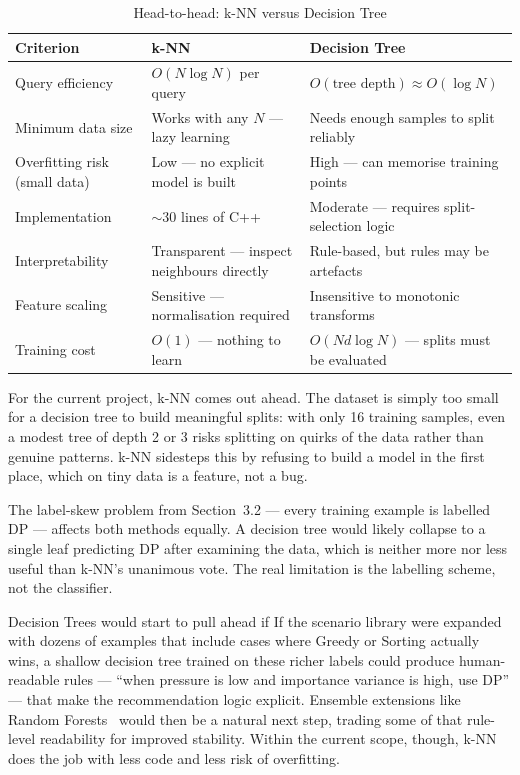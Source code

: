 \documentclass[12pt,a4paper]{article}
\begin{document}
\begin{table}[H]
\centering
\caption{Head-to-head: k-NN versus Decision Tree}
\label{tab:comparison}
\begin{tabular}{@{}p{2.8cm}p{4.2cm}p{4.2cm}@{}}
\toprule
\textbf{Criterion} & \textbf{k-NN} & \textbf{Decision Tree} \\
\midrule
Query efficiency  & \(O(N \log N)\) per query & \(O(\text{tree depth}) \approx O(\log N)\) \\
\addlinespace
Minimum data size & Works with any \(N\) --- lazy learning & Needs enough samples to split reliably \\
\addlinespace
Overfitting risk (small data) & Low --- no explicit model is built & High --- can memorise training points \\
\addlinespace
Implementation    & $\sim$30 lines of C++ & Moderate --- requires split-selection logic \\
\addlinespace
Interpretability  & Transparent --- inspect neighbours directly & Rule-based, but rules may be artefacts \\
\addlinespace
Feature scaling   & Sensitive --- normalisation required & Insensitive to monotonic transforms \\
\addlinespace
Training cost     & \(O(1)\) --- nothing to learn & \(O(Nd \log N)\) --- splits must be evaluated \\
\bottomrule
\end{tabular}
\end{table}

For the current project, k-NN comes out ahead.  The dataset
is simply too small for a decision tree to build meaningful splits:
with only 16 training samples, even a modest tree of depth 2 or 3
risks splitting on quirks of the data rather than genuine patterns.
k-NN sidesteps this by refusing to build a model in the first place,
which on tiny data is a feature, not a bug.

The label-skew problem from Section~3.2 --- every training example
is labelled DP --- affects both methods equally.  A decision tree
would likely collapse to a single leaf predicting DP after examining
the data, which is neither more nor less useful than k-NN's
unanimous vote.  The real limitation is the labelling scheme, not
the classifier.

Decision Trees would start to pull ahead if  If the
scenario library were expanded with dozens of examples that include
cases where Greedy or Sorting actually wins, a shallow decision tree
trained on these richer labels could produce human-readable rules ---
``when pressure is low and importance variance is high, use DP'' ---
that make the recommendation logic explicit.  Ensemble extensions like
Random Forests~\cite{biau2016random} would then be a natural next step,
trading some of that rule-level readability for improved stability.
Within the current scope, though, k-NN does the job with less code
and less risk of overfitting.
\end{document}
